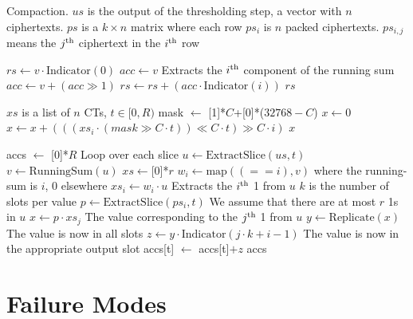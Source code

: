 \documentclass{article}
\begin{document}
	\begin{algorithm}
		\caption{Compaction. $us$ is the output of the thresholding step, a vector with $n$ ciphertexts. $ps$ is a $k\times n$ matrix where each row $ps_i$ is $n$ packed ciphertexts. $ps_{i, j}$ means the $j^{\mathrm{th}}$ ciphertext in the $i^{\mathrm{th}}$ row}\label{alg:compaction}
		\begin{algorithmic}[1]
			\State $rs\gets v \cdot \mathrm{Indicator}(0)$
			\State $acc\gets v$
			\Comment Extracts the $i^{\mathrm{th}}$ component of the running sum
			  \State $acc \gets v + (acc \gg 1)$
			  \State $rs \gets rs + (acc \cdot \mathrm{Indicator}(i))$
			\EndFor
			\State \Return $rs$
			\EndProcedure
			\State
			
			\Comment $xs$ is a list of $n$ CTs, $t\in[0,R)$
			\State mask $\gets$ [1]*$C$+[0]*($32768-C$)
			\State $x\gets 0$
				\State $x\gets x + (((xs_i\cdot (mask \gg C\cdot t)) \ll C\cdot t) \gg C\cdot i)$
			\EndFor
			\State \Return $x$
			\EndProcedure
			\State
			
			\State accs $\gets$ [0]*$R$
			\Comment Loop over each slice
				\State $u\gets \mathrm{ExtractSlice}(us, t)$
				\State $v \gets \mathrm{RunningSum}(u)$
				\State $xs \gets $[0]*$r$
					\State $w_i \gets \mathrm{map}((==i), v)$
					 where the running-sum is $i$, 0 elsewhere
					\State $xs_i \gets w_i\cdot u$
					\Comment Extracts the $i^{\mathrm{th}}$ 1 from $u$
				\EndFor
				\Comment $k$ is the number of slots per value
					\State $p\gets \mathrm{ExtractSlice}(ps_i, t)$
						\Comment We assume that there are at most $r$ 1s in $u$
					    \State $x \gets p\cdot xs_j$
					    \Comment The value corresponding to the $j^{\mathrm{th}}$ 1 from $u$
			  		    \State $y \gets \mathrm{Replicate}(x)$
			  		    \Comment The value is now in all slots
			  		    \State $z \gets y\cdot \mathrm{Indicator}(j\cdot k + i-1)$
					    \Comment The value is now in the appropriate output slot
					    \State accs[t] $\gets$ accs[t]$+z$
			    	\EndFor
				\EndFor
			\EndFor
			\State \Return accs
			\EndProcedure
		\end{algorithmic}
	\end{algorithm}
	
	\section{Failure Modes}
\end{document}
